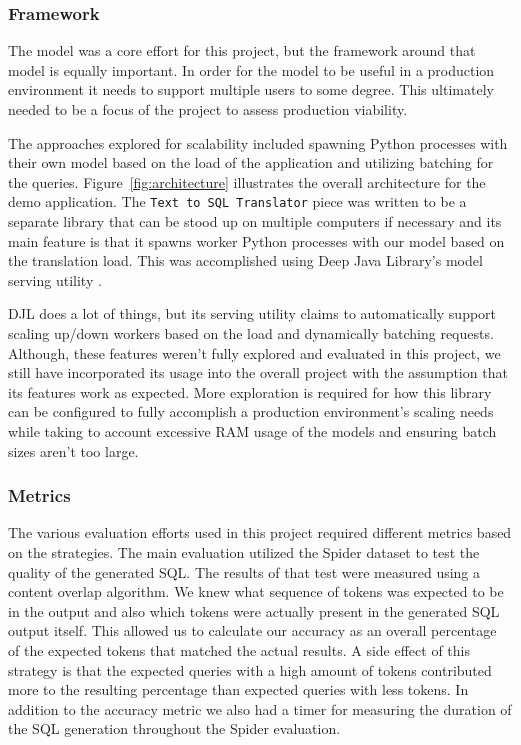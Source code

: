\documentclass[11pt]{article}
\begin{document}
\subsubsection{Framework}

The model was a core effort for this project, but the framework around that model is equally important. In order for the model to be useful in a production environment it needs to support multiple users to some degree. This ultimately needed to be a focus of the project to assess production viability.

The approaches explored for scalability included spawning Python processes with their own model based on the load of the application and utilizing batching for the queries. Figure~\ref{fig:architecture} illustrates the overall architecture for the demo application. The \texttt{Text to SQL Translator} piece was written to be a separate library that can be stood up on multiple computers if necessary and its main feature is that it spawns worker Python processes with our model based on the translation load. This was accomplished using Deep Java Library's model serving utility \citep{djlserving}.

DJL does a lot of things, but its serving utility claims to automatically support scaling up/down workers based on the load and dynamically batching requests. Although, these features weren't fully explored and evaluated in this project, we still have incorporated its usage into the overall project with the assumption that its features work as expected. More exploration is required for how this library can be configured to fully accomplish a production environment's scaling needs while taking to account excessive RAM usage of the models and ensuring batch sizes aren't too large.

\subsubsection{Metrics}

The various evaluation efforts used in this project required different metrics based on the strategies. The main evaluation utilized the Spider dataset to test the quality of the generated SQL. The results of that test were measured using a content overlap algorithm. We knew what sequence of tokens was expected to be in the output and also which tokens were actually present in the generated SQL output itself. This allowed us to calculate our accuracy as an overall percentage of the expected tokens that matched the actual results. A side effect of this strategy is that the expected queries with a high amount of tokens contributed more to the resulting percentage than expected queries with less tokens. In addition to the accuracy metric we also had a timer for measuring the duration of the SQL generation throughout the Spider evaluation.
\end{document}
